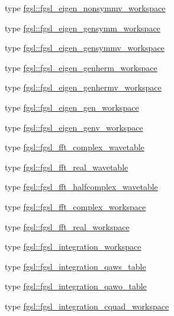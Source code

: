 \begin{DoxyCompactItemize}
\item 
type \hyperlink{structfgsl_1_1fgsl__eigen__nonsymmv__workspace}{fgsl\+::fgsl\+\_\+eigen\+\_\+nonsymmv\+\_\+workspace}
\item 
type \hyperlink{structfgsl_1_1fgsl__eigen__gensymm__workspace}{fgsl\+::fgsl\+\_\+eigen\+\_\+gensymm\+\_\+workspace}
\item 
type \hyperlink{structfgsl_1_1fgsl__eigen__gensymmv__workspace}{fgsl\+::fgsl\+\_\+eigen\+\_\+gensymmv\+\_\+workspace}
\item 
type \hyperlink{structfgsl_1_1fgsl__eigen__genherm__workspace}{fgsl\+::fgsl\+\_\+eigen\+\_\+genherm\+\_\+workspace}
\item 
type \hyperlink{structfgsl_1_1fgsl__eigen__genhermv__workspace}{fgsl\+::fgsl\+\_\+eigen\+\_\+genhermv\+\_\+workspace}
\item 
type \hyperlink{structfgsl_1_1fgsl__eigen__gen__workspace}{fgsl\+::fgsl\+\_\+eigen\+\_\+gen\+\_\+workspace}
\item 
type \hyperlink{structfgsl_1_1fgsl__eigen__genv__workspace}{fgsl\+::fgsl\+\_\+eigen\+\_\+genv\+\_\+workspace}
\item 
type \hyperlink{structfgsl_1_1fgsl__fft__complex__wavetable}{fgsl\+::fgsl\+\_\+fft\+\_\+complex\+\_\+wavetable}
\item 
type \hyperlink{structfgsl_1_1fgsl__fft__real__wavetable}{fgsl\+::fgsl\+\_\+fft\+\_\+real\+\_\+wavetable}
\item 
type \hyperlink{structfgsl_1_1fgsl__fft__halfcomplex__wavetable}{fgsl\+::fgsl\+\_\+fft\+\_\+halfcomplex\+\_\+wavetable}
\item 
type \hyperlink{structfgsl_1_1fgsl__fft__complex__workspace}{fgsl\+::fgsl\+\_\+fft\+\_\+complex\+\_\+workspace}
\item 
type \hyperlink{structfgsl_1_1fgsl__fft__real__workspace}{fgsl\+::fgsl\+\_\+fft\+\_\+real\+\_\+workspace}
\item 
type \hyperlink{structfgsl_1_1fgsl__integration__workspace}{fgsl\+::fgsl\+\_\+integration\+\_\+workspace}
\item 
type \hyperlink{structfgsl_1_1fgsl__integration__qaws__table}{fgsl\+::fgsl\+\_\+integration\+\_\+qaws\+\_\+table}
\item 
type \hyperlink{structfgsl_1_1fgsl__integration__qawo__table}{fgsl\+::fgsl\+\_\+integration\+\_\+qawo\+\_\+table}
\item 
type \hyperlink{structfgsl_1_1fgsl__integration__cquad__workspace}{fgsl\+::fgsl\+\_\+integration\+\_\+cquad\+\_\+workspace}
\item 

\end{DoxyCompactItemize}
